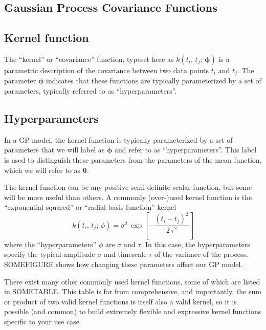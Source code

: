 \documentclass[letterpaper]{ar-1col}
\begin{document}
\subsection{Gaussian Process Covariance Functions}
\label{sec:kernels}

\begin{textbox}[ht]
  \section{Kernel function}
  The ``kernel'' or ``covariance'' function, typeset here as $k(t_i,\,t_j;\,\boldsymbol{\phi})$ is a parametric description of the covariance between two data points $t_i$ and $t_j$. The parameter $\boldsymbol{\phi}$ indicates that these functions are typically parameterized by a set of parameters, typically referred to as ``hyperparameters''.
\end{textbox}

\begin{textbox}[ht]
  \section{Hyperparameters}
  In a GP model, the kernel function is typically parameterized by a set of parameters that we will label as $\boldsymbol{\phi}$ and refer to as ``hyperparameters''. This label is used to distinguish these parameters from the parameters of the mean function, which we will refer to as $\boldsymbol{\theta}$.
\end{textbox}

The kernel function can be any positive semi-definite scalar function, but some will be more useful than others.
A commonly (over-)used kernel function is the ``exponential-squared'' or ``radial basis function'' kernel
\begin{equation}
  k(t_i,\,t_j;\,\phi) = \sigma^2\,\exp\left[-\frac{(t_i - t_j)^2}{2\,\tau^2}\right]
\end{equation}
where the ``hyperparameters'' $\phi$ are $\sigma$ and $\tau$.
In this case, the hyperparameters specify the typical amplitude $\sigma$ and timescale $\tau$ of the variance of the process.
SOMEFIGURE shows how changing these parameters affect our GP model.

There exist many other commonly used kernel functions, some of which are listed in SOMETABLE.
This table is far from comprehensive, and importantly, the sum or product of two valid kernel functions is itself also a valid kernel, so it is possible (and common) to build extremely flexible and expressive kernel functions specific to your use case.
\end{document}
